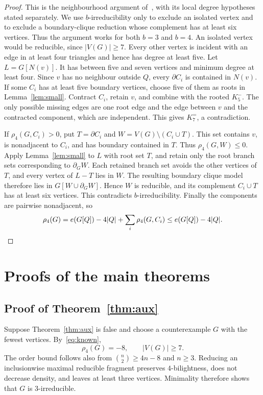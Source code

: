 \documentclass[11pt]{article}
\theoremstyle{remark}
\numberwithin{equation}{section}
\newcommand{\Ke}{K_7^{=}}
\newcommand{\dd}{\partial}
\begin{document}
\begin{proof}
This is the neighbourhood argument of~\cite[Lemma~6.6]{DNR26}, with its local degree hypotheses stated separately. We use $b$-irreducibility only to exclude an isolated vertex and to exclude a boundary-clique reduction whose complement has at least six vertices. Thus the argument works for both $b=3$ and $b=4$. An isolated vertex would be reducible, since $|V(G)|\ge7$. Every other vertex is incident with an edge in at least four triangles and hence has degree at least five. Let $L=G[N(v)]$. It has between five and seven vertices and minimum degree at least four. Since $v$ has no neighbour outside $Q$, every $\dd C_i$ is contained in $N(v)$. If some $C_i$ has at least five boundary vertices, choose five of them as roots in Lemma~\ref{lem:small}. Contract $C_i$, retain $v$, and combine with the rooted $K_5^-$. The only possible missing edges are one root edge and the edge between $v$ and the contracted component, which are independent. This gives $\Ke$, a contradiction.

If $\rho_4(G,C_i)>0$, put $T=\dd C_i$ and $W=V(G)\setminus(C_i\cup T)$. This set contains $v$, is nonadjacent to $C_i$, and has boundary contained in $T$. Thus $\rho_4(G,W)\le0$. Apply Lemma~\ref{lem:small} to $L$ with root set $T$, and retain only the root branch sets corresponding to $\dd_GW$. Each retained branch set avoids the other vertices of $T$, and every vertex of $L-T$ lies in $W$. The resulting boundary clique model therefore lies in $G[W\cup\dd_GW]$. Hence $W$ is reducible, and its complement $C_i\cup T$ has at least six vertices. This contradicts $b$-irreducibility. Finally the components are pairwise nonadjacent, so
\begin{equation}\label{eq:densityneighbourhood}
\rho_4(G)=e(G[Q])-4|Q|+\sum_i\rho_4(G,C_i)\le e(G[Q])-4|Q|.\qedhere
\end{equation}
\end{proof}

\section{Proofs of the main theorems}\label{sec:proofs}
\subsection{Proof of Theorem~\ref{thm:aux}}\label{subsec:aux}
Suppose Theorem~\ref{thm:aux} is false and choose a counterexample $G$ with the fewest vertices. By~\eqref{eq:known},
\begin{equation}\label{eq:auxdensity}
\rho_4(G)=-8,\qquad |V(G)|\ge7.
\end{equation}
The order bound follows also from $\binom{n}{2}\ge4n-8$ and $n\ge3$. Reducing an inclusionwise maximal reducible fragment preserves $4$-bilightness, does not decrease density, and leaves at least three vertices. Minimality therefore shows that $G$ is $3$-irreducible.
\end{document}

